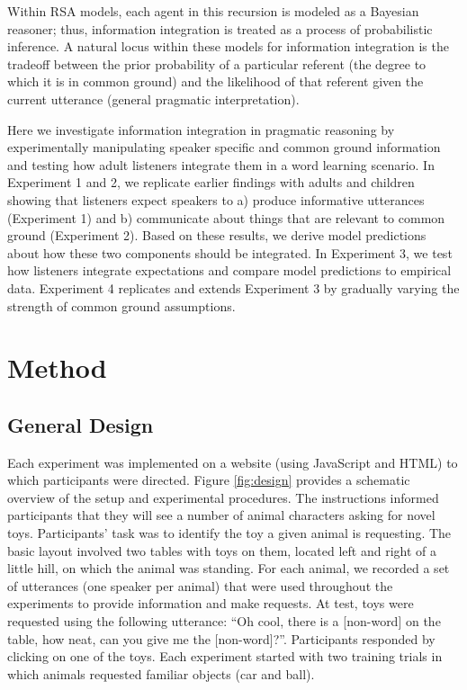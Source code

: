 \documentclass[10pt, letterpaper]{article}
\begin{document}
Within RSA models, each agent in this recursion is modeled as a Bayesian
reasoner; thus, information integration is treated as a process of
probabilistic inference. A natural locus within these models for
information integration is the tradeoff between the prior probability of
a particular referent (the degree to which it is in common ground) and
the likelihood of that referent given the current utterance (general
pragmatic interpretation).

Here we investigate information integration in pragmatic reasoning by
experimentally manipulating speaker specific and common ground
information and testing how adult listeners integrate them in a word
learning scenario. In Experiment 1 and 2, we replicate earlier findings
with adults and children showing that listeners expect speakers to a)
produce informative utterances (Experiment 1) and b) communicate about
things that are relevant to common ground (Experiment 2). Based on these
results, we derive model predictions about how these two components
should be integrated. In Experiment 3, we test how listeners integrate
expectations and compare model predictions to empirical data. Experiment
4 replicates and extends Experiment 3 by gradually varying the strength
of common ground assumptions.

\section{Method}\label{method}

\subsection{General Design}\label{general-design}

Each experiment was implemented on a website (using JavaScript and HTML)
to which participants were directed. Figure \ref{fig:design} provides a
schematic overview of the setup and experimental procedures. The
instructions informed participants that they will see a number of animal
characters asking for novel toys. Participants' task was to identify the
toy a given animal is requesting. The basic layout involved two tables
with toys on them, located left and right of a little hill, on which the
animal was standing. For each animal, we recorded a set of utterances
(one speaker per animal) that were used throughout the experiments to
provide information and make requests. At test, toys were requested
using the following utterance: ``Oh cool, there is a {[}non-word{]} on
the table, how neat, can you give me the {[}non-word{]}?''. Participants
responded by clicking on one of the toys. Each experiment started with
two training trials in which animals requested familiar objects (car and
ball).
\end{document}
